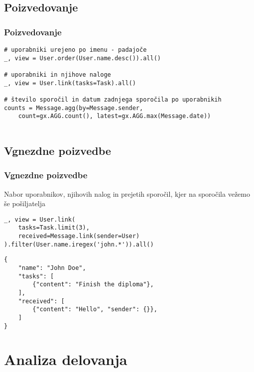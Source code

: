 \documentclass{beamer}
\begin{document}
    \subsection{Poizvedovanje}
    \begin{frame}[fragile]
    \frametitle{Poizvedovanje}
    \footnotesize
    \begin{verbatim}
# uporabniki urejeno po imenu - padajoče
_, view = User.order(User.name.desc()).all()

# uporabniki in njihove naloge
_, view = User.link(tasks=Task).all()

# število sporočil in datum zadnjega sporočila po uporabnikih
counts = Message.agg(by=Message.sender, 
    count=gx.AGG.count(), latest=gx.AGG.max(Message.date))
    
    \end{verbatim}
    \end{frame}

    \subsection{Vgnezdne poizvedbe}
    \begin{frame}[fragile]
    \frametitle{Vgnezdne poizvedbe}
    \begin{block}{Nabor uporabnikov, njihovih nalog in prejetih sporočil, kjer na sporočila vežemo še pošiljatelja}
    \footnotesize
    \begin{verbatim}
_, view = User.link(
    tasks=Task.limit(3), 
    received=Message.link(sender=User)
).filter(User.name.iregex('john.*')).all()
        \end{verbatim}
    \end{block}

    \footnotesize
    \begin{verbatim}
{
    "name": "John Doe",
    "tasks": [
        {"content": "Finish the diploma"},
    ],
    "received": [
        {"content": "Hello", "sender": {}},
    ]
}
    \end{verbatim}
    \end{frame}
    
\section{Analiza delovanja}
\end{document}
